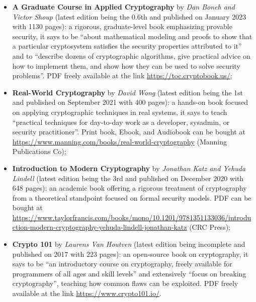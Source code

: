 \begin{itemize}
			
	\item \textbf{A Graduate Course in Applied Cryptography} by \textit{Dan Boneh and Victor Shoup} (latest edition being the 0.6th and published on January 2023 with 1130 pages): a rigorous, graduate-level book emphasizing provable security, it says to be ``about mathematical modeling and proofs to show that a particular cryptosystem satisfies the security properties attributed to it'' and to ``describe dozens of cryptographic algorithms, give practical advice on how to implement them, and show how they can be used to solve security problems''. PDF freely available at the link \url{https://toc.cryptobook.us/};
	
	\item \textbf{Real-World Cryptography} by \textit{David Wong} (latest edition being the 1st and published on September 2021 with 400 pages): a hands-on book focused on applying cryptographic techniques in real systems, it says to teach ``practical techniques for day-to-day work as a developer, sysadmin, or security practitioner''. Print book, Ebook, and Audiobook can be bought at \url{https://www.manning.com/books/real-world-cryptography} (Manning Publications Co);
	
	\item \textbf{Introduction to Modern Cryptography} by \textit{Jonathan Katz and Yehuda Lindell} (latest edition being the 3rd and published on December 2020 with 648 pages): an academic book offering a rigorous treatment of cryptography from a theoretical standpoint focused on formal security models. PDF can be bought at \url{https://www.taylorfrancis.com/books/mono/10.1201/9781351133036/introduction-modern-cryptography-yehuda-lindell-jonathan-katz} (CRC Press);
	
	\item \textbf{Crypto 101} by \textit{Laurens Van Houtven} (latest edition being incomplete and published on 2017 with 223 pages): an open-source book on cryptography, it says to be ``an introductory course on cryptography, freely available for programmers of all ages and skill levels'' and extensively ``focus on breaking cryptography'', teaching how common flaws can be exploited. PDF freely available at the link \url{https://www.crypto101.io/}.
	
\end{itemize}

